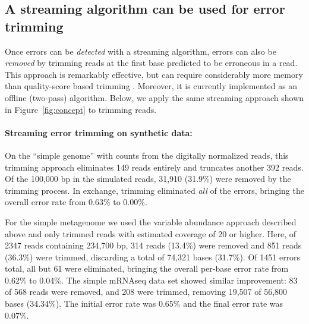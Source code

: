 \documentclass{article}
\begin{document}
\subsection{A streaming algorithm can be used for error trimming}

Once errors can be {\em detected} with a streaming algorithm, errors
can also be {\em removed} by trimming reads at the first base
predicted to be erroneous in a read.  This approach is remarkably
effective, but can require considerably more memory than quality-score
based trimming \cite{Zhang2014}.  Moreover, it is currently
implemented as an offline (two-pass) algorithm.  Below, we apply the same
streaming approach shown in Figure~\ref{fig:concept} to trimming
reads.



\paragraph{Streaming error trimming on synthetic data:}

On the ``simple genome'' with counts from the digitally normalized
reads, this trimming approach eliminates 149 reads entirely and
truncates another 392 reads.  Of the 100,000 bp in the simulated
reads, 31,910 (31.9\%) were removed by the trimming process.  In
exchange, trimming eliminated {\em all} of the errors, bringing the
overall error rate from 0.63\% to 0.00\%.


For the simple metagenome we used the variable abundance approach
described above and only trimmed reads with estimated coverage of 20
or higher.  Here, of 2347 reads containing 234,700 bp, 314 reads
(13.4\%) were removed and 851 reads (36.3\%) were trimmed, discarding
a total of 74,321 bases (31.7\%).  Of 1451 errors total, all but 61
were eliminated, bringing the overall per-base error rate from 0.62\% to
0.04\%.  The simple mRNAseq data set showed similar improvement: 83 of
568 reads were removed, and 208 were trimmed, removing 19,507 of
56,800 bases (34.34\%).  The initial error rate was 0.65\% and the
final error rate was 0.07\%.
\end{document}
